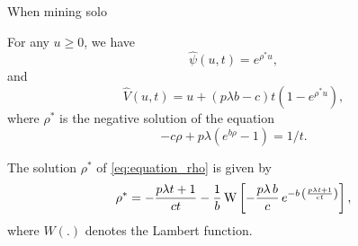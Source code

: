 \documentclass{beamer}
\begin{document}
\begin{frame}{When mining solo}
\scriptsize
\begin{tcolorbox}[enhanced,drop shadow, title=Theorem (profit and ruin when mining solo)]
For any $u\geq0$, we have
\begin{equation*}
\widehat{\psi}(u,t) = e^{\rho^\ast u},
\end{equation*}
and 
\begin{equation*}
\widehat{V}(u,t) = u+(p\lambda b-c)t\left(1-e^{\rho^\ast u }\right),
\end{equation*}
where $\rho^\ast$ is the negative solution of the equation
\begin{equation}\label{eq:equation_rho}
-c\rho + p\lambda(e^{b\rho}-1) = 1/t.
\end{equation}
\end{tcolorbox}
\begin{tcolorbox}[enhanced,drop shadow, title=Lambert function]
The solution $\rho^\ast$ of \eqref{eq:equation_rho} is given by 
\begin{equation*}
  \rho^{\ast}=-\frac{p \lambda t+1}{ct}
  -\frac{1}{b} \,{\rm W} \left[-\frac{p\lambda
    \,b}{c}\,{e^{-b\,\left(\frac{p \lambda t+1}{ct}\right)}}
  \right],
  \end{equation*}
  where $W(.)$ denotes the Lambert function.
\end{tcolorbox}
\end{frame}
\end{document}
